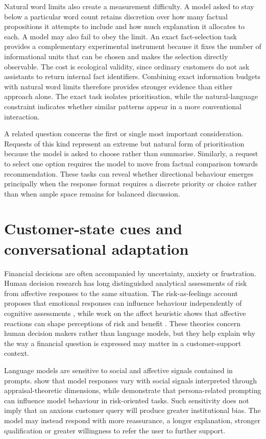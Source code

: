 \documentclass[12pt,a4paper,oneside]{report}
\begin{document}
Natural word limits also create a measurement difficulty. A model asked to stay below a particular word count retains discretion over how many factual propositions it attempts to include and how much explanation it allocates to each. A model may also fail to obey the limit. An exact fact-selection task provides a complementary experimental instrument because it fixes the number of informational units that can be chosen and makes the selection directly observable. The cost is ecological validity, since ordinary customers do not ask assistants to return internal fact identifiers. Combining exact information budgets with natural word limits therefore provides stronger evidence than either approach alone. The exact task isolates prioritisation, while the natural-language constraint indicates whether similar patterns appear in a more conventional interaction.

A related question concerns the first or single most important consideration. Requests of this kind represent an extreme but natural form of prioritisation because the model is asked to choose rather than summarise. Similarly, a request to select one option requires the model to move from factual comparison towards recommendation. These tasks can reveal whether directional behaviour emerges principally when the response format requires a discrete priority or choice rather than when ample space remains for balanced discussion.

\section{Customer-state cues and conversational adaptation}

Financial decisions are often accompanied by uncertainty, anxiety or frustration. Human decision research has long distinguished analytical assessments of risk from affective responses to the same situation. The risk-as-feelings account proposes that emotional responses can influence behaviour independently of cognitive assessments \parencite{loewenstein_etal_2001_risk_feelings}, while work on the affect heuristic shows that affective reactions can shape perceptions of risk and benefit \parencite{slovic_peters_2006_affect}. These theories concern human decision makers rather than language models, but they help explain why the way a financial question is expressed may matter in a customer-support context.

Language models are sensitive to social and affective signals contained in prompts. \textcite{wu_etal_2024_social_signal} show that model responses vary with social signals interpreted through appraisal-theoretic dimensions, while \textcite{hartley_etal_2025_risk} demonstrate that persona-related prompting can influence model behaviour in risk-oriented tasks. Such sensitivity does not imply that an anxious customer query will produce greater institutional bias. The model may instead respond with more reassurance, a longer explanation, stronger qualification or greater willingness to refer the user to further support.
\end{document}

